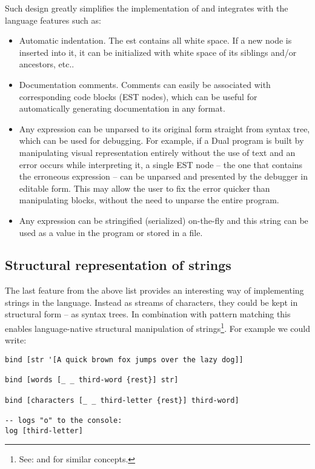 Such design greatly simplifies the implementation of and integrates with
the language features such as:
\begin{itemize}
    \item Automatic indentation. The \acrshort{est} contains all white space. If a new node is inserted into it, it can be initialized with white space of its siblings and/or ancestors, etc..
    \item Documentation comments. Comments can easily be associated with
      corresponding code blocks (EST nodes), which can be useful for
      automatically generating documentation in any format.
    \item Any expression can be unparsed to its original form straight from
      syntax tree, which can be used for debugging. For example, if a Dual program is built by manipulating visual representation entirely without the use of text and an error occurs while interpreting it, a single EST node -- the one that contains the erroneous expression -- can be unparsed and presented by the debugger in editable form. This may allow the user to fix the error quicker than manipulating blocks, without the need to unparse the entire program.
  \item Any expression can be stringified (serialized) on-the-fly and
        this string can be used as a value in the program or stored in a file.
\end{itemize}

\subsection{Structural representation of strings}\label{sub:str}
The last feature from the above list provides an interesting way of implementing strings in the language. Instead as streams of characters, they could be kept in structural form -- as syntax trees. In combination with pattern matching this enables language-native structural manipulation of strings\footnote{See: \cite{wolfram_string_patterns} and \cite[Section~Pattern matching and strings]{pattern_matching_wikipedia} for similar concepts.}. For example we could write:
\begin{lstlisting}
bind [str '[A quick brown fox jumps over the lazy dog]]
            
bind [words [_ _ third-word {rest}] str]

bind [characters [_ _ third-letter {rest}] third-word]

-- logs "o" to the console:
log [third-letter]
\end{lstlisting}
    
